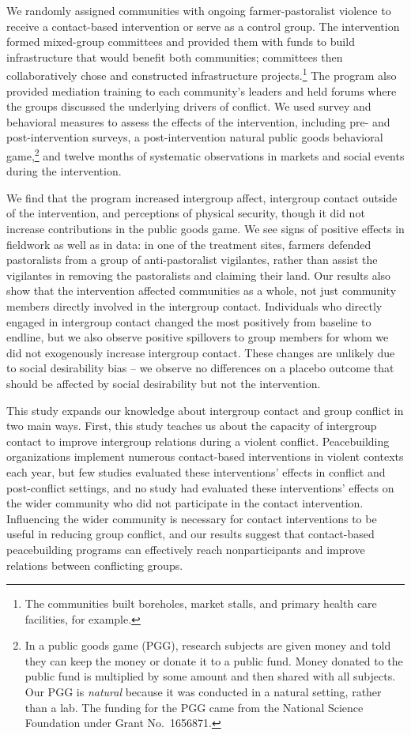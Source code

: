 \documentclass[11pt]{article}
\begin{document}
We randomly assigned communities with ongoing farmer-pastoralist
violence to receive a contact-based intervention or serve as a control
group. The intervention formed mixed-group committees and provided them
with funds to build infrastructure that would benefit both communities;
committees then collaboratively chose and constructed infrastructure
projects.\footnote{The communities built boreholes, market stalls, and
  primary health care facilities, for example.} The program also
provided mediation training to each community's leaders and held forums
where the groups discussed the underlying drivers of conflict. We used
survey and behavioral measures to assess the effects of the
intervention, including pre- and post-intervention surveys, a
post-intervention natural public goods behavioral game,\footnote{In a
  public goods game (PGG), research subjects are given money and told
  they can keep the money or donate it to a public fund. Money donated
  to the public fund is multiplied by some amount and then shared with
  all subjects. Our PGG is \emph{natural} because it was conducted in a
  natural setting, rather than a lab. The funding for the PGG came from
  the National Science Foundation under Grant No.~1656871.} and twelve
months of systematic observations in markets and social events during
the intervention.

We find that the program increased intergroup affect, intergroup contact
outside of the intervention, and perceptions of physical security,
though it did not increase contributions in the public goods game. We
see signs of positive effects in fieldwork as well as in data: in one of
the treatment sites, farmers defended pastoralists from a group of
anti-pastoralist vigilantes, rather than assist the vigilantes in
removing the pastoralists and claiming their land. Our results also show
that the intervention affected communities as a whole, not just
community members directly involved in the intergroup contact.
Individuals who directly engaged in intergroup contact changed the most
positively from baseline to endline, but we also observe positive
spillovers to group members for whom we did not exogenously increase
intergroup contact. These changes are unlikely due to social
desirability bias -- we observe no differences on a placebo outcome that
should be affected by social desirability but not the intervention.

This study expands our knowledge about intergroup contact and group
conflict in two main ways. First, this study teaches us about the
capacity of intergroup contact to improve intergroup relations during a
violent conflict. Peacebuilding organizations implement numerous
contact-based interventions in violent contexts each year, but few
studies evaluated these interventions' effects in conflict and
post-conflict settings, and no study had evaluated these interventions'
effects on the wider community who did not participate in the contact
intervention. Influencing the wider community is necessary for contact
interventions to be useful in reducing group conflict, and our results
suggest that contact-based peacebuilding programs can effectively reach
nonparticipants and improve relations between conflicting groups.
\end{document}
